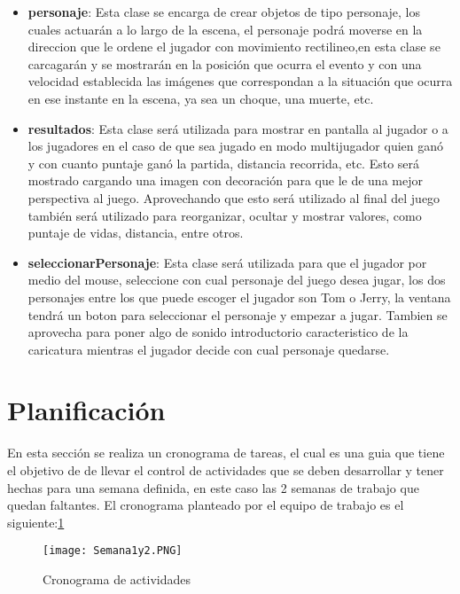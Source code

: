 \documentclass{article}
\begin{document}
\begin{itemize}
 
\item\noindent\textbf{personaje}:
Esta clase se encarga de crear objetos de tipo personaje, los cuales actuarán a lo largo de la escena, el personaje podrá moverse en la direccion que le ordene el jugador con movimiento rectilineo,en esta clase se carcagarán y se mostrarán en la posición que ocurra el evento y con una velocidad establecida las imágenes que correspondan a la situación que ocurra en ese instante en la escena, ya sea un choque, una muerte, etc.\\ 

\item\noindent\textbf{resultados}:
Esta clase será utilizada para mostrar en pantalla al jugador o a  los jugadores en el caso de que sea jugado en modo multijugador quien ganó y con cuanto puntaje ganó la partida, distancia recorrida, etc. Esto será mostrado cargando una imagen con decoración para que le de una mejor perspectiva al juego. Aprovechando que esto será utilizado al final del juego también será utilizado para reorganizar, ocultar y mostrar valores, como puntaje de vidas, distancia, entre otros.\\
 
\item\noindent\textbf{seleccionarPersonaje}:
Esta clase será utilizada para que el jugador por medio del mouse, seleccione con cual personaje del juego desea jugar, los dos personajes entre los que puede escoger el jugador son Tom o Jerry, la ventana tendrá un boton para seleccionar el personaje y empezar a jugar. Tambien se aprovecha para poner algo de sonido introductorio caracteristico de la caricatura mientras el jugador decide con cual personaje quedarse. \\
\end{itemize}

\section{Planificación}
\noindent En esta sección se realiza un cronograma de tareas, el cual es una guia que tiene el objetivo de de llevar el control de actividades que se deben desarrollar y tener hechas para una semana definida, en este caso las 2 semanas de trabajo que quedan faltantes. El cronograma planteado por el equipo de trabajo es el siguiente:\ref{f2}

\begin{figure}[h!]
    \texttt{[image: Semana1y2.PNG]}
    \centering
    \caption{Cronograma de actividades}
    \label{f2}
    \end{figure}
\end{document}
